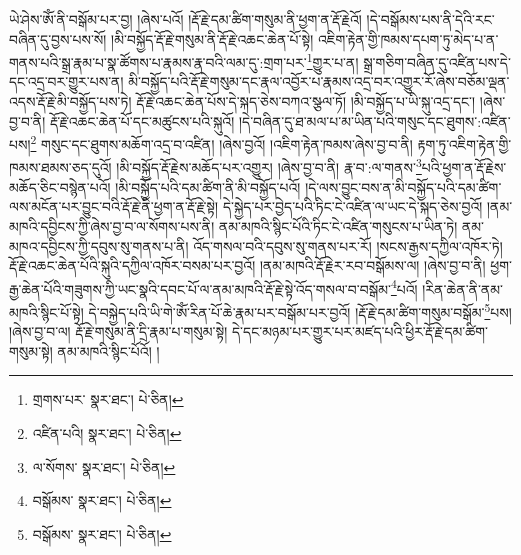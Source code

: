 ཡེ་ཤེས་ཨོཾ་ནི་བསྒོམ་པར་བྱ། །ཞེས་པའོ། །རྡོ་རྗེ་དམ་ཚིག་གསུམ་ནི་ཕྱག་ན་རྡོ་རྗེའོ། །དེ་བསྒོམས་པས་ནི་དེའི་རང་བཞིན་དུ་བྱས་པས་སོ། །མི་བསྐྱོད་རྡོ་རྗེ་གསུམ་ནི་རྡོ་རྗེ་འཆང་ཆེན་པོ་སྟེ། འཇིག་རྟེན་གྱི་ཁམས་དཔག་ཏུ་མེད་པ་ན་གནས་པའི་སྒྲ་རྣམ་པ་སྣ་ཚོགས་པ་རྣམས་རྣ་བའི་ལམ་དུ་:གྲག་པར་\footnote{གྲགས་པར་  སྣར་ཐང་།  པེ་ཅིན། }གྱུར་པ་ན། སྒྲ་གཅིག་བཞིན་དུ་འཛིན་པས་དེ་དང་འདྲ་བར་གྱུར་པས་ན། མི་བསྐྱོད་པའི་རྡོ་རྗེ་གསུམ་དང་རྣལ་འབྱོར་པ་རྣམས་འདྲ་བར་འགྱུར་རོ་ཞེས་བཅོམ་ལྡན་འདས་རྡོ་རྗེ་མི་བསྐྱོད་པས་ཏེ། རྡོ་རྗེ་འཆང་ཆེན་པོས་དེ་སྐད་ཅེས་བཀའ་སྩལ་ཏོ། །མི་བསྐྱོད་པ་ཡི་སྐུ་འདྲ་དང་། །ཞེས་བྱ་བ་ནི། རྡོ་རྗེ་འཆང་ཆེན་པོ་དང་མཚུངས་པའི་སྐུའོ། །དེ་བཞིན་དུ་ཐ་མལ་པ་མ་ཡིན་པའི་གསུང་དང་ཐུགས་:འཛིན་པས།\footnote{འཛིན་པའི།  སྣར་ཐང་།  པེ་ཅིན། } གསུང་དང་ཐུགས་མཆོག་འདྲ་བ་འཛིན། །ཞེས་བྱའོ། །འཇིག་རྟེན་ཁམས་ཞེས་བྱ་བ་ནི། རྟག་ཏུ་འཇིག་རྟེན་གྱི་ཁམས་ཐམས་ཅད་དུའོ། །མི་བསྐྱོད་རྡོ་རྗེས་མཆོད་པར་འགྱུར། །ཞེས་བྱ་བ་ནི། རྣ་བ་:ལ་གནས་\footnote{ལ་སོགས་  སྣར་ཐང་།  པེ་ཅིན། }པའི་ཕྱག་ན་རྡོ་རྗེས་མཆོད་ཅིང་བསྙེན་པའོ། །མི་བསྐྱོད་པའི་དམ་ཚིག་ནི་མི་བསྐྱོད་པའོ། །དེ་ལས་བྱུང་བས་ན་མི་བསྐྱོད་པའི་དམ་ཚིག་ལས་མངོན་པར་བྱུང་བའི་རྡོ་རྗེ་ནི་ཕྱག་ན་རྡོ་རྗེ་སྟེ། དེ་སྐྱེད་པར་བྱེད་པའི་ཏིང་ངེ་འཛིན་ལ་ཡང་དེ་སྐད་ཅེས་བྱའོ། །ནམ་མཁའི་དབྱིངས་ཀྱི་ཞེས་བྱ་བ་ལ་སོགས་པས་ནི། ནམ་མཁའི་སྙིང་པོའི་ཏིང་ངེ་འཛིན་གསུངས་པ་ཡིན་ཏེ། ནམ་མཁའ་དབྱིངས་ཀྱི་དབུས་སུ་གནས་པ་ནི། འོད་གསལ་བའི་དབུས་སུ་གནས་པར་རོ། །སངས་རྒྱས་དཀྱིལ་འཁོར་ཏེ། རྡོ་རྗེ་འཆང་ཆེན་པོའི་སྐུའི་དཀྱིལ་འཁོར་བསམ་པར་བྱའོ། །ནམ་མཁའི་རྡོ་རྗེར་རབ་བསྒོམས་ལ། །ཞེས་བྱ་བ་ནི། ཕྱག་རྒྱ་ཆེན་པོའི་གཟུགས་ཀྱི་ཡང་སྣའི་དབང་པོ་ལ་ནམ་མཁའི་རྡོ་རྗེ་སྟེ་འོད་གསལ་བ་བསྒོམ་\footnote{བསྒོམས་  སྣར་ཐང་།  པེ་ཅིན། }པའོ། །རིན་ཆེན་ནི་ནམ་མཁའི་སྙིང་པོ་སྟེ། དེ་བསྐྱེད་པའི་ཡི་གེ་ཨོཾ་རིན་པོ་ཆེ་རྣམ་པར་བསྒོམ་པར་བྱའོ། །རྡོ་རྗེ་དམ་ཚིག་གསུམ་བསྒོམ་\footnote{བསྒོམས་  སྣར་ཐང་།  པེ་ཅིན། }པས། །ཞེས་བྱ་བ་ལ། རྡོ་རྗེ་གསུམ་ནི་དྲི་རྣམ་པ་གསུམ་སྟེ། དེ་དང་མཉམ་པར་གྱུར་པར་མཛད་པའི་ཕྱིར་རྡོ་རྗེ་དམ་ཚིག་གསུམ་སྟེ། ནམ་མཁའི་སྙིང་པོའོ། །
